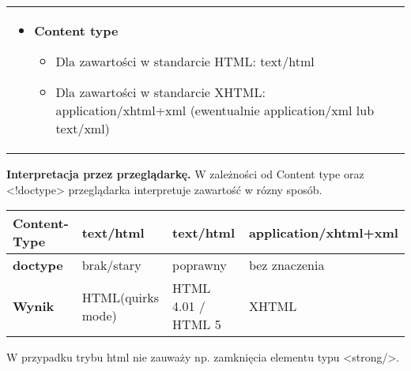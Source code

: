 \documentclass[../main.tex]{subfiles}
\begin{document}
\begin{table}[H]
\begin{center}
\begin{tabular}{p{8cm} p{8cm}}
\begin{itemize}
                    \item \textbf{Content type}
                    \begin{itemize}
                        \item Dla zawartości w standarcie HTML: text/html
                        \item Dla zawartości w standarcie XHTML: application/xhtml+xml (ewentualnie application/xml lub text/xml)
                    \end{itemize}

                \end{itemize}
            \end{tabular}
        \end{center}
    \end{table}
    \textbf{Interpretacja przez przeglądarkę.}
    W zależności od Content type oraz <!doctype> przeglądarka interpretuje zawartość w rózny sposób.

    \begin{table}[H]
        \begin{center}
            \begin{tabular}{|p{4cm}|p{4cm}|p{4cm}|p{4cm}|}
                \hline
                \textbf{Content-Type} & text/html & text/html & application/xhtml+xml\\
                \hline
                \textbf{doctype} & brak/stary & poprawny & bez znaczenia\\
                \hline
                \textbf{Wynik} & HTML(quirks mode) & HTML 4.01 / HTML 5 & XHTML\\
                \hline
            \end{tabular}
        \end{center}
    \end{table}
    W przypadku trybu html nie zauważy np. zamknięcia elementu typu <strong/>.
\end{document}
